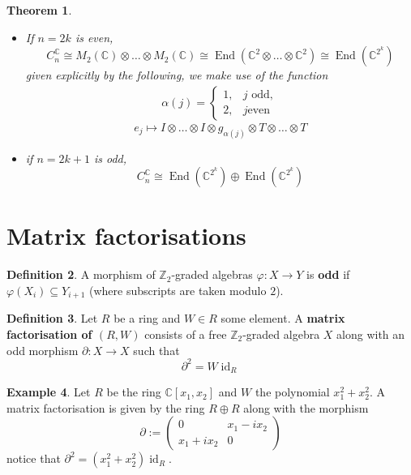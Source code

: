 \documentclass[12pt]{article}
\theoremstyle{plain}
\newtheorem{thm}{Theorem}[subsection] %
\theoremstyle{definition}
\newtheorem{defn}[thm]{Definition} %
\newtheorem{example}[thm]{Example}
\newcommand{\bb}[1]{\mathbb{#1}}
\newcommand{\lto}{\longrightarrow}
\begin{document}
\begin{thm}\label{thm:structure_clifford}
\begin{itemize} There is the following decomposition:
\item If $n = 2k$ is even,
\begin{equation}
C_n^{\bb{C}} \cong M_2(\bb{C}) \otimes \hdots \otimes M_2(\bb{C}) \cong \operatorname{End}(\bb{C}^2 \otimes \hdots \otimes \bb{C}^2) \cong \operatorname{End}(\bb{C}^{2^k})
\end{equation}
given explicitly by the following, we make use of the function
\begin{align*}
\alpha(j) = \begin{cases}
1,& j\text{ odd},\\
2, & j\text{even}
\end{cases}
\end{align*}
\begin{equation}
e_j \longmapsto I \otimes \hdots \otimes I \otimes g_{\alpha(j)} \otimes T \otimes \hdots \otimes T
\end{equation}
\item if $n = 2k+1$ is odd,
\begin{equation}
C_n^{\bb{C}} \cong \operatorname{End}(\bb{C}^{2^k}) \oplus \operatorname{End}(\bb{C}^{2^k})
\end{equation}
\end{itemize}
\end{thm}

\section{Matrix factorisations}
\begin{defn}
A morphism of $\bb{Z}_2$-graded algebras $\varphi:X \lto Y$ is \textbf{odd} if $\varphi(X_i) \subseteq Y_{i+1}$ (where subscripts are taken modulo $2$).
\end{defn}
\begin{defn}
Let $R$ be a ring and $W \in R$ some element. A \textbf{matrix factorisation of $(R,W)$} consists of a free $\bb{Z}_2$-graded algebra $X$ along with an odd morphism $\partial: X \lto X$ such that
\begin{equation}
\partial^2 = W\operatorname{id}_R
\end{equation}
\end{defn}
\begin{example}
Let $R$ be the ring $\bb{C}[x_1,x_2]$ and $W$ the polynomial $x_1^2 + x_2^2$. A matrix factorisation is given by the ring $R \oplus R$ along with the morphism
\begin{equation}
\partial := 
\begin{pmatrix}
0 & x_1 - ix_2\\
x_1 + ix_2 & 0
\end{pmatrix}
\end{equation}
notice that $\partial^2 = (x_1^2 + x_2^2)\operatorname{id}_R$.
\end{example}
\end{document}
